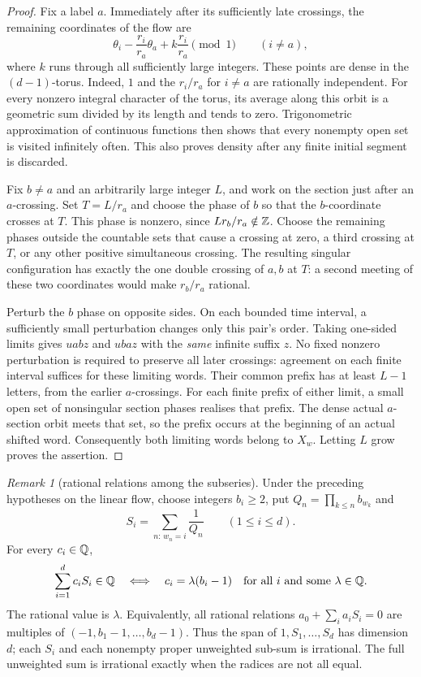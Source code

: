 \documentclass[11pt]{article}
\theoremstyle{remark}
\newtheorem{recordremark}[theorem]{Remark}
\renewenvironment{remark}[1][]{\begin{recordremark}[#1]}{\end{recordremark}}
\theoremstyle{plain}
\begin{document}
\begin{proof}
Fix a label $a$.  Immediately after its sufficiently late crossings,
the remaining coordinates of the flow are
\[
 \theta_i-\frac{r_i}{r_a}\theta_a
       +k\frac{r_i}{r_a}\pmod1\qquad(i\ne a),
\]
where $k$ runs through all sufficiently large integers.  These points
are dense in the $(d-1)$-torus.  Indeed, $1$ and the $r_i/r_a$ for $i\ne a$
are rationally independent.  For every nonzero integral character of
the torus, its average along this orbit is a geometric sum divided by
its length and tends to zero.  Trigonometric approximation of continuous
functions then shows that every nonempty open set is visited infinitely
often.  This also proves density after any finite initial segment is
discarded.

Fix $b\ne a$ and an arbitrarily large integer $L$, and work on the section
just after an $a$-crossing.  Set $T=L/r_a$ and choose the phase of $b$ so
that the $b$-coordinate crosses at $T$.  This phase is nonzero, since
$Lr_b/r_a\notin\mathbb{Z}$.  Choose the remaining phases outside the countable
sets that cause a crossing at zero, a third crossing at $T$, or any other
positive simultaneous crossing.  The resulting singular configuration has
exactly the one double crossing of $a,b$ at $T$: a second meeting of these
two coordinates would make $r_b/r_a$ rational.

Perturb the $b$ phase on opposite sides. On each bounded time interval,
a sufficiently small perturbation changes only this pair's order.
Taking one-sided limits gives $uabz$ and $ubaz$ with the \emph{same}
infinite suffix $z$. No fixed nonzero perturbation is required to preserve
all later crossings: agreement on each finite interval suffices for these
limiting words.  Their common prefix has at least $L-1$ letters,
from the earlier $a$-crossings.  For each finite prefix of either limit,
a small open set of nonsingular section phases realises that prefix.
The dense actual $a$-section orbit meets that set, so the prefix occurs
at the beginning of an actual shifted word.  Consequently both limiting
words belong to $X_w$.  Letting $L$ grow proves the assertion.
\end{proof}

\begin{remark}[rational relations among the subseries]
\label{long269:thm:clock-relations}
Under the preceding hypotheses on the linear flow, choose integers $b_i\ge2$, put
$Q_n=\prod_{k\le n}b_{w_k}$ and
\[
 S_i=\sum_{n:\,w_n=i}\frac1{Q_n}\qquad(1\le i\le d).
\]
For every $c_i\in\mathbb{Q}$,
\[
 \sum_{i=1}^dc_iS_i\in\mathbb{Q}
 \quad\Longleftrightarrow\quad
 c_i=\lambda(b_i-1)\quad\hbox{for all $i$ and some $\lambda\in\mathbb{Q}$}.
\]
The rational value is $\lambda$.  Equivalently, all rational relations
$a_0+\sum_i a_iS_i=0$ are multiples of
$(-1,b_1-1,\ldots,b_d-1)$.  Thus the span of
$1,S_1,\ldots,S_d$ has dimension $d$; each $S_i$ and each nonempty
proper unweighted sub-sum is irrational.  The full unweighted sum is
irrational exactly when the radices are not all equal.
\end{remark}
\end{document}

